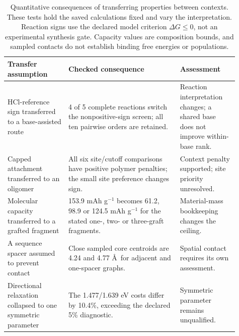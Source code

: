 \begin{table}[htbp]\centering\small
\caption{Quantitative consequences of transferring properties between contexts. These tests hold the saved calculations fixed and vary the interpretation. Reaction signs use the declared model criterion $\Delta G\leq0$, not an experimental synthesis gate. Capacity values are composition bounds, and sampled contacts do not establish binding free energies or populations.}
\begin{tabular}{p{0.24\linewidth}p{0.44\linewidth}p{0.23\linewidth}}
\toprule
Transfer assumption & Checked consequence & Assessment \\
\midrule
HCl-reference sign transferred to a base-assisted route & 4 of 5 complete reactions switch the nonpositive-sign screen; all ten pairwise orders are retained. & Reaction interpretation changes; a shared base does not improve within-base rank. \\
Capped attachment transferred to an oligomer & All six site/cutoff comparisons have positive polymer penalties; the small site preference changes sign. & Context penalty supported; site priority unresolved. \\
Molecular capacity transferred to a grafted fragment & 153.9 mAh g$^{-1}$ becomes 61.2, 98.9 or 124.5 mAh g$^{-1}$ for the stated one-, two- or three-graft fragments. & Material-mass bookkeeping changes the ceiling. \\
A sequence spacer assumed to prevent contact & Close sampled core centroids are 4.24 and 4.77 \AA\ for adjacent and one-spacer graphs. & Spatial contact requires its own assessment. \\
Directional relaxation collapsed to one symmetric parameter & The 1.477/1.639 eV costs differ by 10.4\%, exceeding the declared 5\% diagnostic. & Symmetric parameter remains unqualified. \\
\bottomrule
\end{tabular}
\label{tab:context-consequences}
\end{table}
